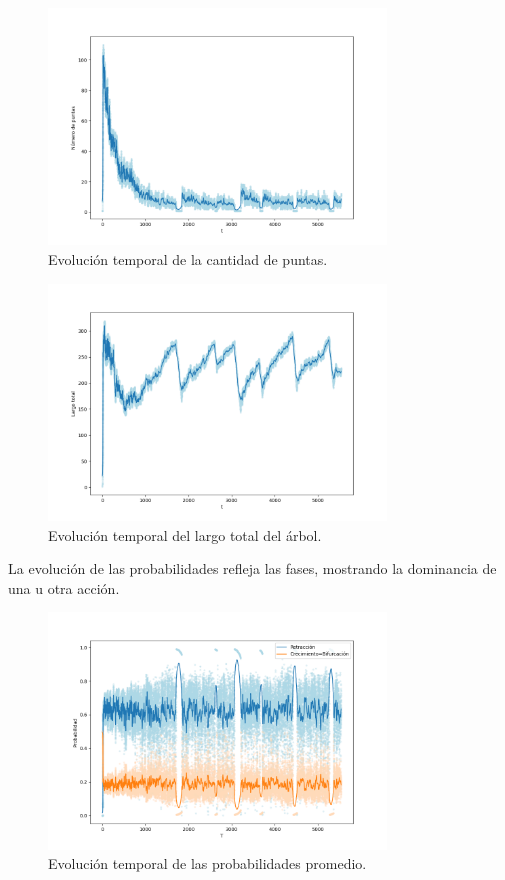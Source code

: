 \documentclass{article}
\begin{document}
\newpage
\begin{figure}[h!]
    \centering
    \includegraphics[width=0.8\textwidth]{graficos_inst/N_vs_tiempo.png}
    \caption[]{Evolución temporal de la cantidad de puntas.\footnotemark}
    \label{fig:evolucion_N}
\end{figure}

\begin{figure}[h!]
    \centering
    \includegraphics[width=0.8\textwidth]{graficos_inst/largo_vs_tiempo.png}
    \caption{Evolución temporal del largo total del árbol.}
    \label{fig:evolucion_tamano}
\end{figure}

La evolución de las probabilidades refleja las fases, mostrando la dominancia de una u otra acción.
\newpage
\begin{figure}[h!]
    \centering
    \includegraphics[width=0.8\textwidth]{graficos_inst/probs_vs_tiempo.png}
    \caption{Evolución temporal de las probabilidades promedio.}
    \label{fig:evolucion_probabilidades}
\end{figure}
\end{document}
